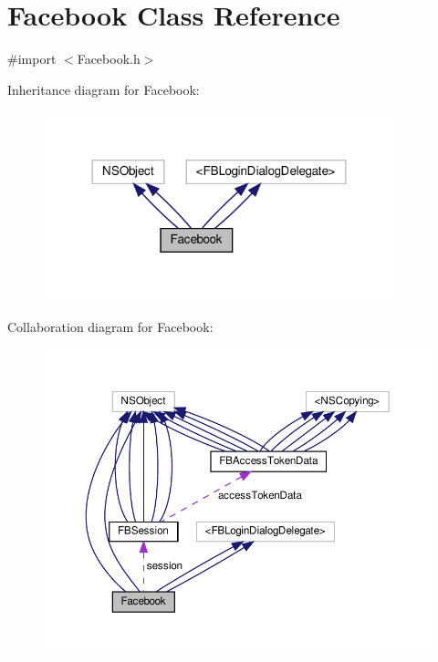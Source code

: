 \hypertarget{interfaceFacebook}{}\section{Facebook Class Reference}
\label{interfaceFacebook}


{\ttfamily \#import $<$Facebook.\+h$>$}



Inheritance diagram for Facebook\+:
\nopagebreak
\begin{figure}[H]
\begin{center}
\leavevmode
\includegraphics[width=288pt]{interfaceFacebook__inherit__graph}
\end{center}
\end{figure}


Collaboration diagram for Facebook\+:
\nopagebreak
\begin{figure}[H]
\begin{center}
\leavevmode
\includegraphics[width=350pt]{interfaceFacebook__coll__graph}
\end{center}
\end{figure}

